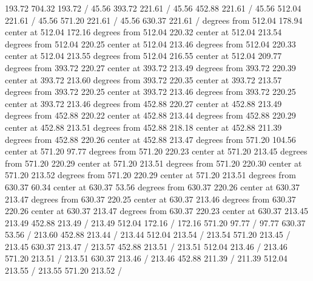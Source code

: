 {\setsolid
{} 193.72 704.32 193.72 /
\setsolid
{} 45.56 393.72 221.61 /
\setsolid
{} 45.56 452.88 221.61 /
\setsolid
{} 45.56 512.04 221.61 /
\setsolid
{} 45.56 571.20 221.61 /
\setsolid
{} 45.56 630.37 221.61 /
 degrees from 512.04 178.94 center at 512.04 172.16
 degrees from 512.04 220.32 center at 512.04 213.54
 degrees from 512.04 220.25 center at 512.04 213.46
 degrees from 512.04 220.33 center at 512.04 213.55
 degrees from 512.04 216.55 center at 512.04 209.77
 degrees from 393.72 220.27 center at 393.72 213.49
 degrees from 393.72 220.39 center at 393.72 213.60
 degrees from 393.72 220.35 center at 393.72 213.57
 degrees from 393.72 220.25 center at 393.72 213.46
 degrees from 393.72 220.25 center at 393.72 213.46
 degrees from 452.88 220.27 center at 452.88 213.49
 degrees from 452.88 220.22 center at 452.88 213.44
 degrees from 452.88 220.29 center at 452.88 213.51
 degrees from 452.88 218.18 center at 452.88 211.39
 degrees from 452.88 220.26 center at 452.88 213.47
 degrees from 571.20 104.56 center at 571.20 97.77
 degrees from 571.20 220.23 center at 571.20 213.45
 degrees from 571.20 220.29 center at 571.20 213.51
 degrees from 571.20 220.30 center at 571.20 213.52
 degrees from 571.20 220.29 center at 571.20 213.51
 degrees from 630.37 60.34 center at 630.37 53.56
 degrees from 630.37 220.26 center at 630.37 213.47
 degrees from 630.37 220.25 center at 630.37 213.46
 degrees from 630.37 220.26 center at 630.37 213.47
 degrees from 630.37 220.23 center at 630.37 213.45
\setdashpattern <4pt, 4pt>
 213.49 452.88 213.49 /
 213.49 512.04 172.16 /
 172.16 571.20 97.77 /
 97.77 630.37 53.56 /
\setdashpattern <4pt, 4pt>
 213.60 452.88 213.44 /
 213.44 512.04 213.54 /
 213.54 571.20 213.45 /
 213.45 630.37 213.47 /
\setdashpattern <4pt, 4pt>
 213.57 452.88 213.51 /
 213.51 512.04 213.46 /
 213.46 571.20 213.51 /
 213.51 630.37 213.46 /
\setdashpattern <4pt, 4pt>
 213.46 452.88 211.39 /
 211.39 512.04 213.55 /
 213.55 571.20 213.52 /
}
